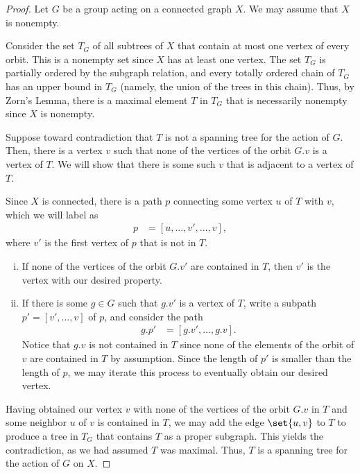 \documentclass[10pt]{mypackage}
\begin{document}
\begin{proof}
  Let $G$ be a group acting on a connected graph $X$. We may assume that $X$ is nonempty.

  Consider the set $ T_G $ of all subtrees of $X$ that contain at most one vertex of every orbit. This is a nonempty set since $X$ has at least one vertex. The set $T_G$ is partially ordered by the subgraph relation, and every totally ordered chain of $T_G$ has an upper bound in $T_G$ (namely, the union of the trees in this chain). Thus, by Zorn's Lemma, there is a maximal element $T$ in $T_G$ that is necessarily nonempty since $X$ is nonempty.

  Suppose toward contradiction that $T$ is not a spanning tree for the action of $G$. Then, there is a vertex $v$ such that none of the vertices of the orbit $G.v$ is a vertex of $T$. We will show that there is some such $v$ that is adjacent to a vertex of $T$.

  Since $X$ is connected, there is a path $p$ connecting some vertex $u$ of $T$ with $v$, which we will label as
  \begin{align*}
    p &= [u,\dots,v',\dots,v],
  \end{align*}
  where $v'$ is the first vertex of $p$ that is not in $T$.
  \begin{enumerate}[(i)]
    \item If none of the vertices of the orbit $G.v'$ are contained in $T$, then $v'$ is the vertex with our desired property.
    \item If there is some $g\in G$ such that $g.v'$ is a vertex of $T$, write a subpath $p' = \left[ v',\dots,v \right]$ of $p$, and consider the path
      \begin{align*}
        g.p' &= \left[ g.v',\dots,g.v \right].
      \end{align*}
      Notice that $g.v$ is not contained in $T$ since none of the elements of the orbit of $v$ are contained in $T$ by assumption. Since the length of $p'$ is smaller than the length of $p$, we may iterate this process to eventually obtain our desired vertex.
  \end{enumerate}
  Having obtained our vertex $v$ with none of the vertices of the orbit $G.v$ in $T$ and some neighbor $u$ of $v$ is contained in $T$, we may add the edge $\set{u,v}$ to $T$ to produce a tree in $T_G$ that contains $T$ as a proper subgraph. This yields the contradiction, as we had assumed $T$ was maximal. Thus, $T$ is a spanning tree for the action of $G$ on $X$.
\end{proof}
\end{document}
